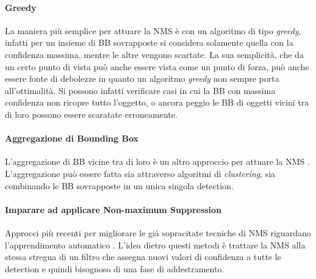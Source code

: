 \paragraph{Greedy}
La maniera più semplice per attuare la \ac{NMS} è con un algoritmo di tipo \textit{greedy}, infatti per un insieme di \ac{BB} sovrapposte si considera solamente quella con la confidenza massima, mentre le altre vengono scartate. La sua semplicità, che da un certo punto di vista può anche essere vista come un punto di forza, può anche essere fonte di debolezze in quanto un algoritmo \textit{greedy} non sempre porta all'ottimalità. Si possono infatti verificare casi in cui la \ac{BB} con massima confidenza non ricopre tutto l'oggetto, o ancora peggio le \ac{BB} di oggetti vicini tra di loro possono essere scaratate erroneamente.


\paragraph{Aggregazione di Bounding Box}
L'aggregazione di \ac{BB} vicine tra di loro è un altro approccio per attuare la \ac{NMS} \cite{viola2001rapid, sermanet2013overfeat, rothe2014non, mrowca2015spatial}. L'aggregazione può essere fatta sia attraverso algoritmi di \textit{clustering}, sia combinando le \ac{BB} sovrapposte in un unica singola detection. 


\paragraph{Imparare ad applicare Non-maximum Suppression}
Approcci più recenti per migliorare le già sopracitate tecniche di \ac{NMS} riguardano l'apprendimento automatico \cite{wan2015end, desai2011discriminative, hosang2017learning, henderson2016end}. L'idea dietro questi metodi è trattare la \ac{NMS} alla stessa stregua di un filtro che assegna nuovi valori di confidenza a tutte le detection e quindi bisognoso di una fase di addestramento. 

